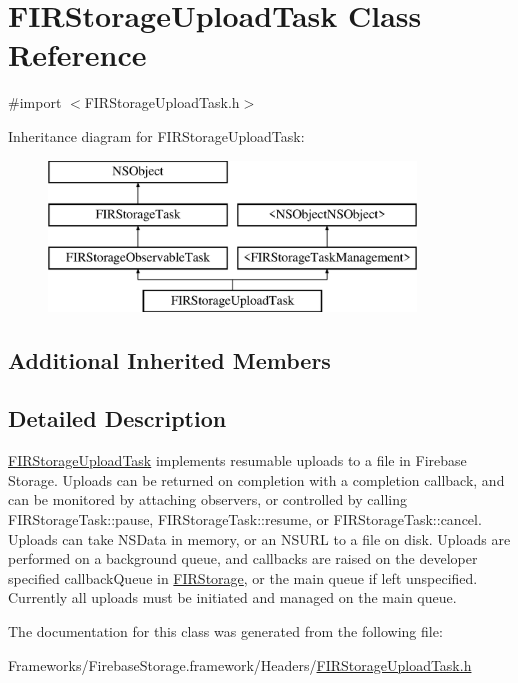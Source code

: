 \hypertarget{interface_f_i_r_storage_upload_task}{}\section{F\+I\+R\+Storage\+Upload\+Task Class Reference}
\label{interface_f_i_r_storage_upload_task}


{\ttfamily \#import $<$F\+I\+R\+Storage\+Upload\+Task.\+h$>$}

Inheritance diagram for F\+I\+R\+Storage\+Upload\+Task\+:\begin{figure}[H]
\begin{center}
\leavevmode
\includegraphics[height=4.000000cm]{interface_f_i_r_storage_upload_task}
\end{center}
\end{figure}
\subsection*{Additional Inherited Members}


\subsection{Detailed Description}
\hyperlink{interface_f_i_r_storage_upload_task}{F\+I\+R\+Storage\+Upload\+Task} implements resumable uploads to a file in Firebase Storage. Uploads can be returned on completion with a completion callback, and can be monitored by attaching observers, or controlled by calling F\+I\+R\+Storage\+Task\+::pause, F\+I\+R\+Storage\+Task\+::resume, or F\+I\+R\+Storage\+Task\+::cancel. Uploads can take N\+S\+Data in memory, or an N\+S\+U\+R\+L to a file on disk. Uploads are performed on a background queue, and callbacks are raised on the developer specified callback\+Queue in \hyperlink{interface_f_i_r_storage}{F\+I\+R\+Storage}, or the main queue if left unspecified. Currently all uploads must be initiated and managed on the main queue. 

The documentation for this class was generated from the following file\+:\begin{DoxyCompactItemize}
\item 
Frameworks/\+Firebase\+Storage.\+framework/\+Headers/\hyperlink{_f_i_r_storage_upload_task_8h}{F\+I\+R\+Storage\+Upload\+Task.\+h}\end{DoxyCompactItemize}
